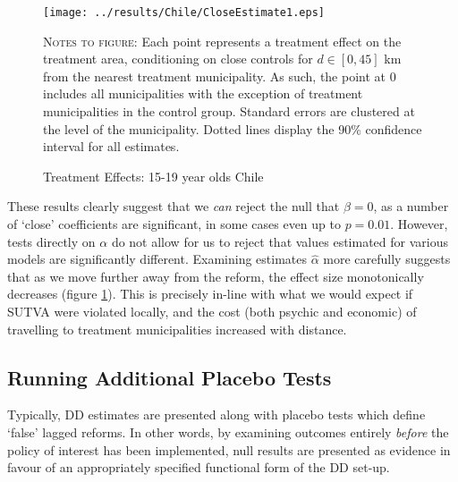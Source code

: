 \documentclass{article}
\begin{document}
\begin{spacing}{1.1}
\begin{figure}[htpb!]
\texttt{[image: ../results/Chile/CloseEstimate1.eps]}
\caption{Treatment Effects: 15-19 year olds Chile}
\label{Sfig:ChileAlpha}
\vspace{2mm}
\begin{footnotesize}
\textsc{Notes to figure}: Each point represents a treatment effect on the treatment
area, conditioning on close controls for $d\in [0,45]$ km from the nearest treatment 
municipality.  As such, the point at 0 includes all municipalities with the exception
of treatment municipalities in the control group.  Standard errors are clustered at 
the level of the municipality.  Dotted lines display the 90\% confidence interval for 
all estimates.
\end{footnotesize}
\end{figure}

These results clearly suggest that we \emph{can} reject the null that $\beta=0$, as
a number of `close' coefficients are significant, in some cases even up to $p=0.01$.
However, tests directly on $\alpha$ do not allow for us to reject that values 
estimated for various models are significantly different.  Examining estimates 
$\hat\alpha$ more carefully suggests that as we move further away from the reform,
the effect size monotonically decreases (figure \ref{Sfig:ChileAlpha}).  This is
precisely in-line with what we would expect if SUTVA were violated locally, and
the cost (both psychic and economic) of travelling to treatment municipalities
increased with distance.

\subsection{Running Additional Placebo Tests}
Typically, DD estimates are presented along with placebo tests which define `false'
lagged reforms.  In other words, by examining outcomes entirely \emph{before} the
policy of interest has been implemented, null results are presented as evidence
in favour of an appropriately specified functional form of the DD set-up.


\end{spacing}
\end{document}
